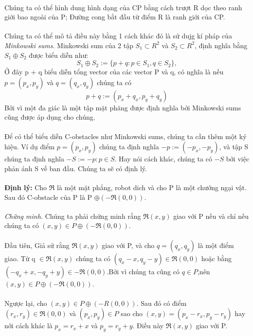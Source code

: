 \documentclass[a4paper,12pt]{report}
\begin{document}
 \\
Chúng ta có thể hình dung hình dạng của CP bằng cách trượt R dọc theo ranh giới bao ngoài của P; Đường cong bắt đầu từ điểm R là ranh giới của CP. \\ \\
Chúng ta có thể mô tả điều này bằng 1 cách khác đó là sử dujg kí pháp của \textit{Minkowski sums}. Minkowski sum của 2 tập $S_1 \subset R^2$ và $S_2 \subset R^2$, định nghĩa bằng $S_1 \oplus S_2$ được biểu diễn như:
\begin{displaymath}
S_1 \oplus S_2 := \{ p + q: p \in S_1, q\in S_2\},
\end{displaymath}
Ở đây p + q biểu diễn tổng vector của các vector P và q, có nghĩa là nếu $p = (p_x,p_y)$ và $q = (q_x,q_y)$ chúng ta có
\begin{displaymath}
p + q := (p_x + q_x, p_y + q_y)
\end{displaymath}
Bởi vì một đa giác là một tập mặt phăng được  định nghĩa bởi Minkowski sums cũng được áp dụng cho chúng. \\ \\
Để có thể biểu diễn C-obstacles như Minkowski sums, chúng ta cần thêm một ký hiệu. Ví dụ điểm $p = (p_x,p_y)$ chúng ta định nghĩa $-p:= (-p_x,-p_y)$, và tập S chúng ta định nghĩa $-S:= {-p : p \in S}$. Hay nói cách khác, chúng ta có $-S$ bởi việc phản ánh S về ban đầu. Chúng ta sẽ có định lý.\\ \\
\textbf{Định lý: } Cho $\Re$ là một mặt phẳng, robot dich và cho  P là một chướng ngại vật. Sau đó C-obstacle của P là P $\oplus (-\Re(0,0))$. \\ \\
\textit{Chứng minh.} Chúng ta phải chứng minh rằng $\Re(x,y)$ giao với P nếu và chỉ nếu chúng ta có $(x,y) \in P \oplus (-\Re(0,0)).$\\ \\
Đầu tiên, Giả sử rằng $\Re(x,y)$ giao với P, và cho $q = (q_x,q_y)$ là một điểm giao. Từ q $\in \Re(x,y)$ chúng ta có $(q_x -x , q_y - y) \in \Re(0,0)$ hoặc bằng $(-q_x + x, -q_y + y)\in -\Re(0,0)$.Bởi vì chúng ta cũng có $q \in P$,nên $(x,y) \in P \oplus (-\Re(0,0))$.\\ \\
Ngược lại, cho $(x,y) \in P \oplus (-R(0,0))$. Sau đó có điểm $(r_x,r_y) \in \Re(0,0)$ và $(p_x,p_y)\in P$ sao cho $(x,y) = (p_x - r_x, p_y - r_y)$ hay nới cách khác là $p_x = r_x + x$ và $p_y = r_y + y$. Điều này $\Re(x,y)$ giao với P.\\ \\
\end{document}
